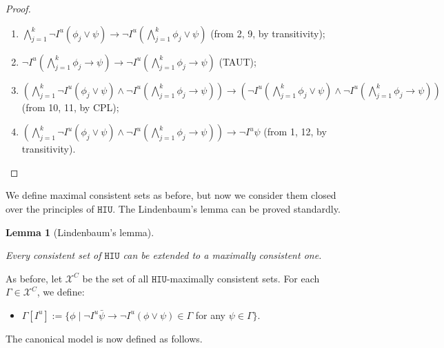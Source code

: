 \documentclass{article}
\newtheorem{lemma}{Lemma}
\begin{document}
\begin{proof}
\begin{enumerate}
\item $\bigwedge^{k}_{j=1}  \neg I^{u}( \phi_{j} \vee \psi) \rightarrow \neg I^{u} (\bigwedge^{k}_{j=1} \phi_{j}  \vee \psi)$ (from 2, 9, by transitivity);

\item $\neg I^{u} (\bigwedge^{k}_{j=1} \phi_{j} \rightarrow \psi) \rightarrow \neg I^{u} (\bigwedge^{k}_{j=1} \phi_{j} \rightarrow \psi)$ (TAUT);

\item $(\bigwedge^{k}_{j=1}  \neg I^{u}( \phi_{j} \vee \psi) \wedge \neg I^{u} (\bigwedge^{k}_{j=1} \phi_{j}\rightarrow \psi)) \rightarrow (\neg I^{u} (\bigwedge^{k}_{j=1} \phi_{j} \vee \psi) \wedge \neg I^{u} (\bigwedge^{k}_{j=1} \phi_{j} \rightarrow \psi))$ (from 10, 11, by CPL);

\item $(\bigwedge^{k}_{j=1} \neg I^{u} ( \phi_{j} \vee \psi) \wedge  \neg I^{u} (\bigwedge^{k}_{j=1}\phi_{j} \rightarrow \psi)) \rightarrow \neg I^{u} \psi$ (from 1, 12, by transitivity).

\end{enumerate}

\end{proof}

We define maximal consistent sets as before, but now we consider them closed over the principles of $\mathtt{HIU}$. The Lindenbaum's lemma can be proved standardly.

\begin{lemma}[Lindenbaum's lemma]
\label{LindIU}

Every consistent set of $\mathtt{HIU}$ can be extended to a maximally consistent one.

\end{lemma}

As before, let $\mathcal{X}^{C}$ be the set of all $\mathtt{HIU}$-maximally consistent sets. For each $\Gamma \in \mathcal{X}^{C}$, we define:

\begin{itemize}

\item $\Gamma[I^{u}] := \{ \phi \mid  \neg I^{u} \bar{\psi} \rightarrow \neg I^{u}(\phi \vee \psi) \in \Gamma$ for any $\psi \in \Gamma\}$.


\end{itemize}


The canonical model is now defined as follows.
\end{document}
